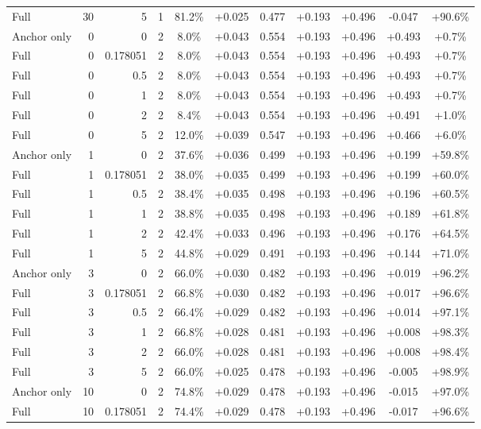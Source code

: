 \begin{table}[htbp]
\begin{tabular}{lrrrccccccc}
Full & 30 & 5 & 1 & 81.2\% & +0.025 & 0.477 & +0.193 & +0.496 & -0.047 & +90.6\% \\
Anchor only & 0 & 0 & 2 & 8.0\% & +0.043 & 0.554 & +0.193 & +0.496 & +0.493 & +0.7\% \\
Full & 0 & 0.178051 & 2 & 8.0\% & +0.043 & 0.554 & +0.193 & +0.496 & +0.493 & +0.7\% \\
Full & 0 & 0.5 & 2 & 8.0\% & +0.043 & 0.554 & +0.193 & +0.496 & +0.493 & +0.7\% \\
Full & 0 & 1 & 2 & 8.0\% & +0.043 & 0.554 & +0.193 & +0.496 & +0.493 & +0.7\% \\
Full & 0 & 2 & 2 & 8.4\% & +0.043 & 0.554 & +0.193 & +0.496 & +0.491 & +1.0\% \\
Full & 0 & 5 & 2 & 12.0\% & +0.039 & 0.547 & +0.193 & +0.496 & +0.466 & +6.0\% \\
Anchor only & 1 & 0 & 2 & 37.6\% & +0.036 & 0.499 & +0.193 & +0.496 & +0.199 & +59.8\% \\
Full & 1 & 0.178051 & 2 & 38.0\% & +0.035 & 0.499 & +0.193 & +0.496 & +0.199 & +60.0\% \\
Full & 1 & 0.5 & 2 & 38.4\% & +0.035 & 0.498 & +0.193 & +0.496 & +0.196 & +60.5\% \\
Full & 1 & 1 & 2 & 38.8\% & +0.035 & 0.498 & +0.193 & +0.496 & +0.189 & +61.8\% \\
Full & 1 & 2 & 2 & 42.4\% & +0.033 & 0.496 & +0.193 & +0.496 & +0.176 & +64.5\% \\
Full & 1 & 5 & 2 & 44.8\% & +0.029 & 0.491 & +0.193 & +0.496 & +0.144 & +71.0\% \\
Anchor only & 3 & 0 & 2 & 66.0\% & +0.030 & 0.482 & +0.193 & +0.496 & +0.019 & +96.2\% \\
Full & 3 & 0.178051 & 2 & 66.8\% & +0.030 & 0.482 & +0.193 & +0.496 & +0.017 & +96.6\% \\
Full & 3 & 0.5 & 2 & 66.4\% & +0.029 & 0.482 & +0.193 & +0.496 & +0.014 & +97.1\% \\
Full & 3 & 1 & 2 & 66.8\% & +0.028 & 0.481 & +0.193 & +0.496 & +0.008 & +98.3\% \\
Full & 3 & 2 & 2 & 66.0\% & +0.028 & 0.481 & +0.193 & +0.496 & +0.008 & +98.4\% \\
Full & 3 & 5 & 2 & 66.0\% & +0.025 & 0.478 & +0.193 & +0.496 & -0.005 & +98.9\% \\
Anchor only & 10 & 0 & 2 & 74.8\% & +0.029 & 0.478 & +0.193 & +0.496 & -0.015 & +97.0\% \\
Full & 10 & 0.178051 & 2 & 74.4\% & +0.029 & 0.478 & +0.193 & +0.496 & -0.017 & +96.6\% \\

\end{tabular}
\end{table}
